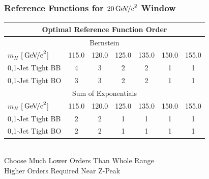 \documentclass{beamer}
\newcommand{\GeVcc}{\ensuremath{\,\mathrm{Ge\kern -0.1em V\!/c}^2}}
\begin{document}
\begin{frame}
\frametitle{Reference Functions for $20\GeVcc{}$ Window}
\scriptsize
\begin{center}
\begin{tabular}{|l|c|c|c|c|c|c|} \hline
\multicolumn{7}{|c|}{ \bf Optimal Reference Function Order} \\ \hline
\multicolumn{7}{|c|}{Bernstein} \\ \hline
$m_H$ [\GeVcc{}]                     &    115.0 &    120.0 &    125.0 &    135.0 &    150.0 &    155.0 \\ \hline
0,1-Jet Tight BB     &        4 &        3 &        2 &        2 &        1 &        1 \\ \hline
0,1-Jet Tight BO     &        3 &        3 &        2 &        2 &        1 &        1 \\ \hline
\multicolumn{7}{|c|}{Sum of Exponentials} \\ \hline
$m_H$ [\GeVcc{}]                    &    115.0 &    120.0 &    125.0 &    135.0 &    150.0 &    155.0 \\ \hline
0,1-Jet Tight BB     &        2 &        2 &        1 &        1 &        1 &        1 \\ \hline
0,1-Jet Tight BO     &        2 &        2 &        1 &        1 &        1 &        1 \\ \hline
\end{tabular}
\\
\normalsize
\vspace{1ex}
Choose Much Lower Orders Than Whole Range
\\
Higher Orders Required Near Z-Peak
\end{center}
\end{frame}
\end{document}
